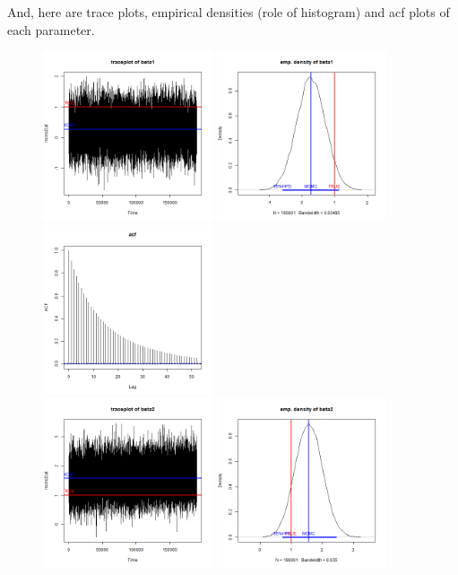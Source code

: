 \documentclass{article}
\begin{document}
And, here are trace plots, empirical densities (role of histogram) and acf plots of
each parameter.

\clearpage
\begin{figure}[h]
    \centering
    \includegraphics[width=5cm]{prob3_beta1_traceplot.png} 
    \includegraphics[width=5cm]{prob3_beta1_density.png} 
    \includegraphics[width=5cm]{prob3_beta1_acf.png} \\
    \includegraphics[width=5cm]{prob3_beta2_traceplot.png} 
    \includegraphics[width=5cm]{prob3_beta2_density.png} 

\end{figure}
\end{document}
